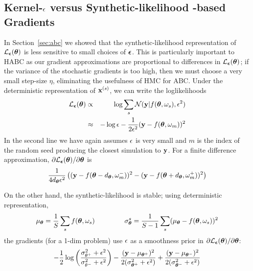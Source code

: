 \documentclass[]{article}
\begin{document}
\subsection{Kernel-$\epsilon$ versus Synthetic-likelihood -based Gradients}
In Section~\ref{sec:abc} we showed that the synthetic-likelihood representation of $\mathcal{L}_{{\bm {\epsilon}}}({\bm \theta})$ is less sensitive to small choices of ${\bm {\epsilon}}$.  This is particularly important to HABC as our gradient approximations are proportional to differences in $\mathcal{L}_{{\bm {\epsilon}}}({\bm \theta})$; if the variance of the stochastic gradients is too high, then we must choose a very small step-size $\eta$, eliminating the usefulness of HMC for ABC.  Under the deterministic representation of ${\bf x}^{(s)}$, we can write the loglikelihoods
\begin{eqnarray}
 \mathcal{L}_{{\bm {\epsilon}}}({\bm \theta}) & \propto & \log \sum_s \mathcal{N}( {\bf y} | f( {\bm \theta}, \omega_s), \epsilon^2 )\\
                 & \approx & -\log \epsilon -\frac{1}{2 \epsilon^2} ( {\bf y} - f( {\bm \theta}, \omega_m) )^2 
\end{eqnarray}
In the second line we have again assumes $\epsilon$ is very small and $m$ is the index of the random seed producing the closest simulation to ${\bf y}$.  For a finite difference approximation, $\partial \mathcal{L}_{{\bm {\epsilon}}}({\bm \theta})/\partial{\bm \theta}$ is
\begin{equation}
 \frac{1}{4d_{{\bm \theta}} \epsilon^2} \left( ( {\bf y} - f( {\bm \theta}-d_{{\bm \theta}}, \omega_m^-) )^2 -( {\bf y} - f( {\bm \theta} + d_{{\bm \theta}}, \omega_m^+) )^2 \right)
\end{equation}

On the other hand, the synthetic-likelihood is stable; using deterministic representation, 
\begin{equation}
\mu_{{\bm \theta}} = \frac{1}{S} \sum_s f( {\bm \theta}, \omega_s ) ~~~~~~~~~~~~~ \sigma^s_{{\bm \theta}} = \frac{1}{S-1} \sum_s ( \mu_{{\bm \theta}} - f( {\bm \theta}, \omega_s ) )^2
\end{equation}
the gradients (for a 1-dim problem) use $\epsilon$ as a smoothness prior in $\partial \mathcal{L}_{{\bm {\epsilon}}}({\bm \theta})/\partial{\bm \theta}$:
\begin{equation}
  -\frac{1}{2}\log\left(\frac{\sigma_{\theta^+}^2 + \epsilon^2}{\sigma_{\theta^-}^2 + \epsilon^2}\right) -\frac{( {\bf y} - \mu_{{\bm \theta}^+} )^2 }{2 (\sigma^2_{{\bm \theta}^+} + \epsilon^2 )} +\frac{( {\bf y} - \mu_{{\bm \theta}^-} )^2 }{2 (\sigma^2_{{\bm \theta}^-} + \epsilon^2 )} 
\end{equation} 
\end{document}

